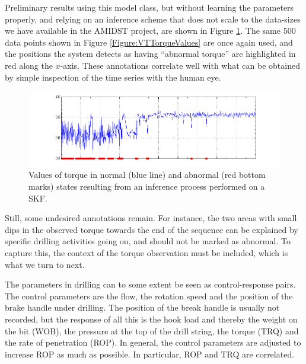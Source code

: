 Preliminary results using this model class, but without learning the parameters properly, and relying on an inference scheme that does not scale to the data-sizes we have available in the AMIDST project, are shown in Figure \ref{Figure:VTEraticTorqueMarked}. The same 500 data points shown  in Figure \ref{Figure:VTTorqueValues} are once again used, and the positions the system detects as having ``abnormal torque'' are highlighted in red along the $x$-axis. These annotations correlate well with what can be obtained by simple inspection of the time series with the human eye. 

\begin{figure}[ht!]
\begin{center}
\includegraphics[scale=0.3]{./figures/VT_ErraticTRQ_marked} 
\caption{\label{Figure:VTEraticTorqueMarked} Values of torque in normal (blue line) and abnormal (red bottom marks) states resulting from an inference process performed on a SKF.}
\end{center}
\end{figure}

Still, some undesired annotations remain. For instance, the two areas with small dips in the observed torque towards the end of the sequence can be explained by specific drilling activities going on, and should not be marked as abnormal. To capture this, the context of the torque observation must be included, which is what we turn to next.

The parameters in drilling can to some extent be seen as control-response pairs. The control parameters are the flow, the rotation speed and the position of the brake handle under drilling. The position of the break handle is usually not recorded, but the response of all this is the hook load and thereby the weight on the bit (WOB), the pressure at the top of the drill string, the torque (TRQ) and the rate of penetration (ROP). In general, the control parameters are adjusted to increase ROP as much as possible. In particular, ROP and TRQ are correlated.


